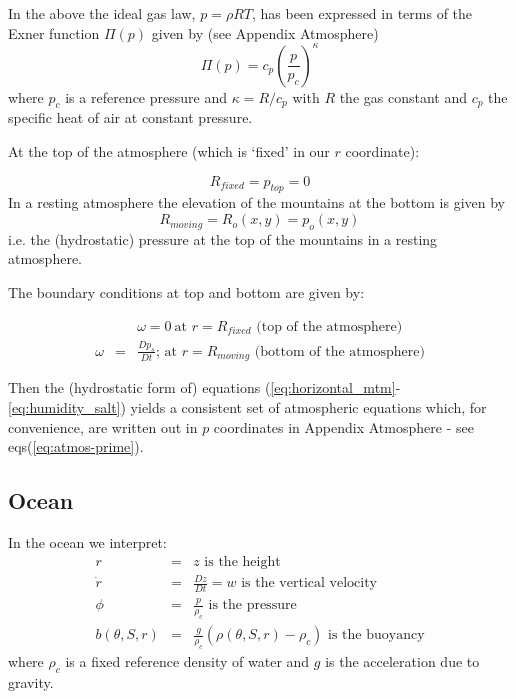 In the above the ideal gas law, $p=\rho RT$, has been expressed in terms of
the Exner function $\Pi (p)$ given by (see Appendix Atmosphere) 
\begin{equation}
\Pi (p)=c_{p}(\frac{p}{p_{c}})^{\kappa }  \label{eq:exner}
\end{equation}
where $p_{c}$ is a reference pressure and $\kappa =R/c_{p}$ with $R$ the gas
constant and $c_{p}$ the specific heat of air at constant pressure.

At the top of the atmosphere (which is `fixed' in our $r$ coordinate):

\begin{equation*}
R_{fixed}=p_{top}=0
\end{equation*}
In a resting atmosphere the elevation of the mountains at the bottom is
given by 
\begin{equation*}
R_{moving}=R_{o}(x,y)=p_{o}(x,y)
\end{equation*}
i.e. the (hydrostatic) pressure at the top of the mountains in a resting
atmosphere.

The boundary conditions at top and bottom are given by:

\begin{eqnarray}
&&\omega =0~\text{at }r=R_{fixed} \text{ (top of the atmosphere)}
\label{eq:fixed-bc-atmos} \\
\omega &=&\frac{Dp_{s}}{Dt}\text{; at }r=R_{moving}\text{ (bottom of the
atmosphere)}  \label{eq:moving-bc-atmos}
\end{eqnarray}

Then the (hydrostatic form of) equations (\ref{eq:horizontal_mtm}-\ref{eq:humidity_salt}) 
yields a consistent set of atmospheric equations which, for convenience, are written out in $p$
coordinates in Appendix Atmosphere - see eqs(\ref{eq:atmos-prime}).

\subsection{Ocean}

In the ocean we interpret: 
\begin{eqnarray}
r &=&z\text{ is the height}  \label{eq:ocean-z} \\
\dot{r} &=&\frac{Dz}{Dt}=w\text{ is the vertical velocity}
\label{eq:ocean-w} \\
\phi &=&\frac{p}{\rho _{c}}\text{ is the pressure}  \label{eq:ocean-p} \\
b(\theta ,S,r) &=&\frac{g}{\rho _{c}}\left( \rho (\theta ,S,r)-\rho
_{c}\right) \text{ is the buoyancy}  \label{eq:ocean-b}
\end{eqnarray}
where $\rho _{c}$ is a fixed reference density of water and $g$ is the
acceleration due to gravity.\noindent

